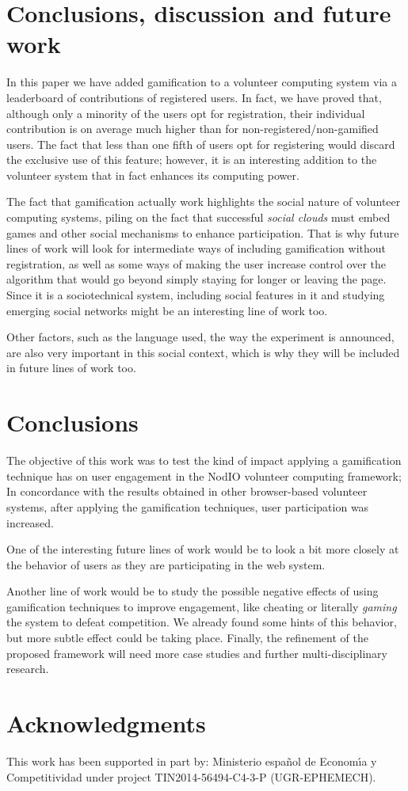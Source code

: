 \documentclass{llncs}
\begin{document}
\section{Conclusions, discussion and future work}

In this paper we have added gamification to a volunteer computing
system via a leaderboard of contributions of registered users. In
fact, we have proved that, although only a minority of the users opt
for registration, their individual contribution is on average much
higher than for non-registered/non-gamified users. The fact that less
than one fifth of users opt for registering would discard the
exclusive use of this feature; however, it is an interesting addition
to the volunteer system that in fact enhances its computing power.

The fact that gamification actually work highlights the social nature of volunteer computing systems, piling on the fact that successful {\em social clouds} must embed games and other social mechanisms to enhance participation. That is why future lines of work will look for intermediate ways of including
gamification without registration, as well as some ways of making the user increase control over the algorithm that would go beyond simply staying for longer or leaving the page. Since it is a sociotechnical system, including social features in it and studying emerging social networks might be an interesting line of work too. 

Other factors, such as the language used, the way the experiment is announced, are also very important in this social context, which is why they will be included in future lines of work too. 

\section{Conclusions}
\label{sec:conclusions}

The objective of this work was to test the kind of impact 
applying a gamification technique has on user engagement in 
the {\sf NodIO} volunteer computing framework; In concordance with 
the results obtained in other 
browser-based volunteer systems, after 
applying the gamification techniques, user participation was increased. 

One of the interesting future lines of work would be to look a bit
more closely at the behavior of users as they are participating  
in the web system. 

Another line of work would be to study the possible negative effects of using  
gamification techniques to improve engagement, like cheating or
literally {\em gaming} the system to defeat competition. We already
found some hints of this behavior, but more subtle effect could be taking place. 
Finally, the refinement of the proposed framework will need
more case studies and further multi-disciplinary research.


\section*{Acknowledgments}

This work has been supported in part by: Ministerio espa\~{n}ol de
Econom\'{\i}a y Competitividad under project TIN2014-56494-C4-3-P
(UGR-EPHEMECH).




\end{document}
